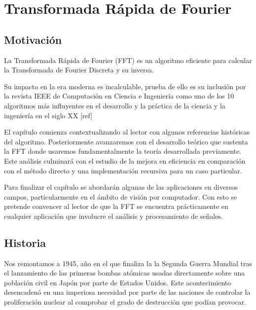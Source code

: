\chapter{Transformada Rápida de Fourier}






\section{Motivación}
La Transformada Rápida de Fourier (FFT) es un algoritmo eficiente para calcular la Transformada de Fourier Discreta  y su inversa.

\noindent Su impacto en la era moderna es incalculable, prueba de ello es su inclusión por la revista IEEE de Computación en Ciencia e Ingeniería como uno de  los 10 algoritmos más influyentes en el desarrollo y la práctica de la ciencia y la ingeniería en el siglo XX [ref]


\noindent El capítulo comienza  contextualizando al lector con algunos referencias históricas del algoritmo.  Posteriormente avanzaremos con el desarrollo teórico que sustenta la FFT donde usaremos fundamentalmente la teoría desarrollada previamente. Este análisis  culminará con el estudio de la mejora en eficiencia en  comparación con el método directo y una implementación recursiva para un caso particular.


\noindent Para finalizar el capítulo se abordarán algunas de las aplicaciones en diversos campos, particularmente en el ámbito de visión por computador. Con esto se pretende convencer al lector de que la FFT se encuentra prácticamente en cualquier aplicación que involucre el análisis y procesamiento de señales.




\section{Historia}












Nos remontamos a 1945, año en el que finaliza la la Segunda Guerra Mundial tras el lanzamiento de las primeras bombas atómicas usadas directamente sobre una población civil en Japón por parte de Estados Unidos. Este acontecimiento desencadenó en  una imperiosa necesidad por parte de las naciones de controlar la proliferación nuclear al comprobar el grado de destrucción que podían provocar.

